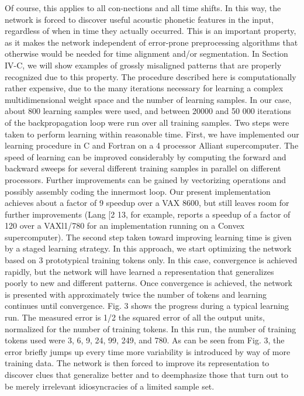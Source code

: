 Of course, this applies to all con-nections and all time shifts. In this way, the network is forced to discover useful acoustic phonetic features in the input, regardless of when in time they actually occurred. 
This is an important property, as it makes the network independent of error-prone preprocessing algorithms that otherwise would be needed for time alignment and/or segmentation.
In Section IV-C, we will show examples of grossly misaligned patterns that are properly recognized due to this property.
The procedure described here is computationally rather expensive, due to the many iterations necessary for learning a complex multidimensional weight space and the number of learning samples.
In our case, about 800 learning samples were used, and between 20000 and 50 000 iterations of the backpropagation loop were run over all training samples. 
Two steps were taken to perform learning within reasonable time.
First, we have implemented our learning procedure in C and Fortran on a 4 processor Alliant supercomputer. 
The speed of learning can be improved considerably by computing the forward and backward sweeps for several different training samples in parallel on different processors. 
Further improvements can be gained by vectorizing operations and possibly assembly coding the innermost loop. 
Our present implementation achieves about a factor of 9 speedup over a VAX 8600, but still leaves room for further improvements (Lang [2 13, for example, reports a speedup of a factor of 120 over a VAXl1/780 for an implementation running on a Convex supercomputer). 
The second step taken toward improving learning time is given by a staged learning strategy. 
In this approach, we start optimizing the network based on 3 prototypical training tokens only.
In this case, convergence is achieved rapidly, but the network will have learned a representation that generalizes poorly to new and different patterns. 
Once convergence is achieved, the network is presented with approximately twice the number of tokens and learning continues until convergence.
Fig. 3 shows the progress during a typical learning run.
The measured error is 1/2 the squared error of all the output units, normalized for the number of training tokens. 
In this run, the number of training tokens used were 3, 6, 9, 24, 99, 249, and 780. 
As can be seen from Fig. 3, the error briefly jumps up every time more variability is introduced by way of more training data. 
The network is then forced to improve its representation to discover clues that generalize better and to deemphasize those that turn out to be merely irrelevant idiosyncracies of a limited sample set. 
